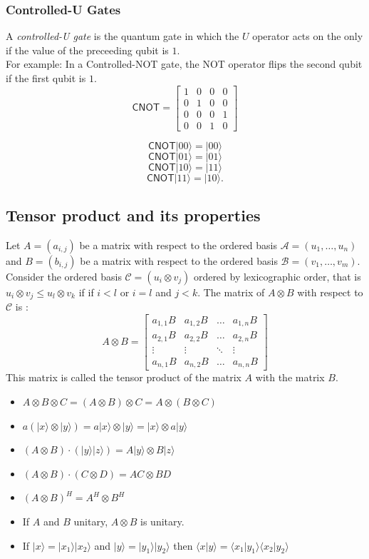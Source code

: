 \documentclass[11pt]{article}
\newcommand{\ket}[1]{|#1\rangle}
\def\dotproduct[#1,#2]{
\langle #1 | #2 \rangle
}
\begin{document}
\subsubsection*{Controlled-U Gates}
	A \emph{controlled-U gate} is the quantum gate in which the $U$ operator acts on the  only if the value of the preceeding qubit is $1$.\\ For example: In a Controlled-\textsf{NOT} gate, the \textsf{NOT} operator flips the second qubit if the first qubit is $1$.
	\[
	\textsf{CNOT} = \begin{bmatrix}
 1&0&0&0\\
0&1&0&0\\
0&0&0&1 \\
0&0&1&0\end{bmatrix}
	\]
	
	\[
	\textsf{CNOT}\ket{00}=\ket{00}
	\]
	\[
	\textsf{CNOT}\ket{01}=\ket{01}
	\]
	\[
	\textsf{CNOT}\ket{10}=\ket{11}
	\]
	\[
	\textsf{CNOT}\ket{11}=\ket{10}.
	\]
	
	
\subsection {Tensor product and its properties}

Let $A=(a_{i,j})$ be a matrix with respect to the ordered basis $\mathcal{A}=(u_1,\dots,u_n)$ and $B=(b_{i,j})$ be a matrix with respect to the ordered basis $\mathcal{B}=(v_1,\dots,v_m)$. Consider the ordered basis $\mathcal{C}=(u_i \otimes v_j)$ ordered by lexicographic order, that is $u_i \otimes v_j \leq u_l \otimes v_k$ if if $i<l$ or $i=l$ and $j<k$. The matrix of $A \otimes B$ with respect to $\mathcal{C}$ is : 
\[
	A \otimes B= 
	\begin{bmatrix}
 	a_{1,1}B & a_{1,2}B & \dots & a_{1,n}B\\
	a_{2,1}B & a_{2,2}B & \dots & a_{2,n}B\\
	\vdots & \vdots & \ddots & \vdots \\
	a_{n,1}B & a_{n,2}B & \dots & a_{n,n}B
	\end{bmatrix} 
\]
		This matrix is called the tensor product of the matrix $A$ with the matrix $B$.
\begin{itemize}
\item $A \otimes B \otimes C =  (A \otimes B ) \otimes C = A \otimes (B \otimes C)$
\item $ a ( \ket{x} \otimes \ket{y}) = a \ket{x} \otimes \ket{y} = \ket{x} \otimes a\ket{y}$
\item $ ( A \otimes B) \cdot (\ket{y}\ket{z}) = A\ket{y} \otimes B\ket{z}$
\item $ ( A \otimes B) \cdot ( C \otimes D) = AC \otimes BD$
\item $ (A \otimes B) ^{H} = A^{H} \otimes B^{H}$
\item If $ A$ and $B$ unitary, $A \otimes B$ is unitary.
\item If $\ket{x}=\ket{x_1} \ket{x_2}$ and $\ket{y}=\ket{y_1}\ket{y_2}$ then $\dotproduct[x,y]=\dotproduct[x_1,y_1] \dotproduct[x_2, y_2]$ 
\end{itemize}
	
\end{document}
